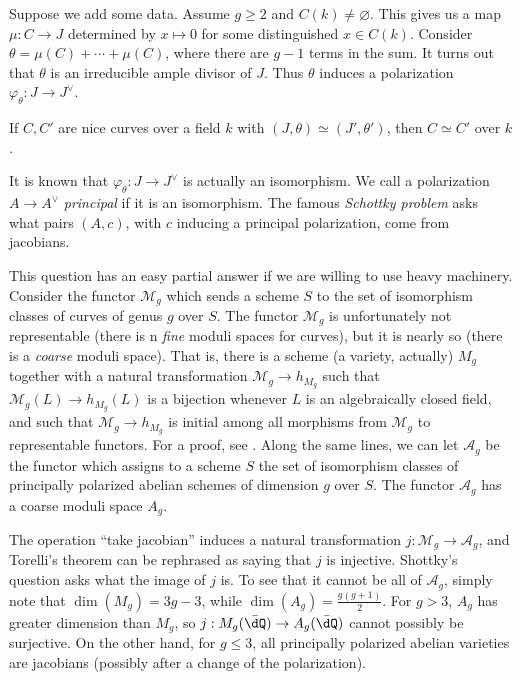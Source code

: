 Suppose we add some data. Assume $g\geqslant 2$ and $C(k)\ne\varnothing$. This 
gives us a map $\mu:C\to J$ determined by $x\mapsto 0$ for some distinguished 
$x\in C(k)$. Consider $\theta = \mu(C)+\cdots + \mu(C)$, where there are $g-1$ 
terms in the sum. It turns out that $\theta$ is an irreducible ample divisor of 
$J$. Thus $\theta$ induces a polarization $\varphi_\theta:J\to J^\vee$. 

\begin{theorem}[Torelli]
If $C,C'$ are nice curves over a field $k$ with $(J,\theta)\simeq (J',\theta')$, 
then $C\simeq C'$ over $k$. 
\end{theorem}

It is known that $\varphi_\theta:J\to J^\vee$ is actually an isomorphism. We 
call a polarization $A\to A^\vee$ \emph{principal} if it is an isomorphism. 
The famous \emph{Schottky problem} asks 
what pairs $(A,c)$, with $c$ inducing a principal polarization, come from 
jacobians. 

This question has an easy partial answer if we are willing to use heavy 
machinery. Consider the functor $\mathcal{M}_g$ which sends a scheme $S$ to the 
set of isomorphism classes of curves of genus $g$ over $S$. The functor 
$\mathcal{M}_g$ is unfortunately not representable (there is n 
\emph{fine} moduli spaces for curves), but it is nearly so (there is a 
\emph{coarse} moduli space). That is, there is a scheme (a variety, 
actually) $M_g$ together with a natural transformation 
$\mathcal{M}_g\to h_{M_g}$ such that $\mathcal{M}_g(L)\to h_{M_g}(L)$ is a 
bijection whenever $L$ is an algebraically closed field, and such that 
$\mathcal{M}_g\to h_{M_g}$ is initial among all morphisms from $\mathcal{M}_g$ 
to representable functors. For a proof, see \cite[5]{mu94}. Along the same lines, 
we can let $\mathcal{A}_g$ be the functor which assigns to a scheme $S$ the set 
of isomorphism classes of principally polarized abelian schemes of dimension 
$g$ over $S$. The functor $\mathcal{A}_g$ has a coarse moduli space $A_g$. 

The operation ``take jacobian'' induces a natural transformation 
$j:\mathcal{M}_g\to\mathcal{A}_g$, and Torelli's theorem can be rephrased as 
saying that $j$ is injective. Shottky's question asks what the image of $j$ is. 
To see that it cannot be all of $\mathcal{A}_g$, simply note that 
$\dim(M_g) = 3 g - 3$, while $\dim(A_g) = \frac{g(g+1)}{2}$. For 
$g>3$, $A_g$ has greater dimension than $M_g$, so 
$j:M_g(\bar\dQ)\to A_g(\bar\dQ)$ cannot possibly be surjective. On the other 
hand, for $g\leqslant 3$, all principally polarized abelian varieties are 
jacobians (possibly after a change of the polarization). 

